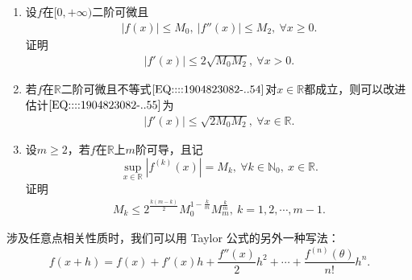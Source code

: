 \documentclass[../../main.tex]{subfiles}%
\begin{document}
\begin{proposition}[导数内插]\label{proposition:导数内插}
\begin{enumerate}
\item 设\( f \)在\( [0,+\infty) \)二阶可微且
\begin{align}
|f(x)| \leqslant M_0, \ |f''(x)| \leqslant M_2, \ \forall x \geqslant 0. \label{EQ::::1904823082-..54}
\end{align}
证明
\begin{align}
|f'(x)| \leqslant 2\sqrt{M_0 M_2}, \ \forall x > 0. \label{EQ::::1904823082-..55}
\end{align}

\item 若\( f \)在\( \mathbb{R} \)二阶可微且不等式\(\eqref{EQ::::1904823082-..54}\)对\( x \in \mathbb{R} \)都成立，则可以改进估计\(\eqref{EQ::::1904823082-..55}\)为
\begin{align}
|f'(x)| \leqslant \sqrt{2 M_0 M_2}, \ \forall x \in \mathbb{R}. \label{EQ::::1904823082-..56}
\end{align}

\item 设\( m \geqslant 2 \)，若\( f \)在\( \mathbb{R} \)上\( m \)阶可导，且记
\[
\sup_{x \in \mathbb{R}} \left| f^{(k)}(x) \right| = M_k, \ \forall k \in \mathbb{N}_0, \ x \in \mathbb{R}.
\]
证明
\begin{align}
M_k \leqslant 2^{\frac{k(m - k)}{2}} M_0^{1 - \frac{k}{m}} M_m^{\frac{k}{m}}, \ k = 1,2,\cdots, m - 1. \label{EQ::::1904823082-..57}
\end{align}
\end{enumerate}
\end{proposition}
\begin{note}
涉及任意点相关性质时，我们可以用 Taylor 公式的另外一种写法：
\[
f(x + h) = f(x) + f'(x)h + \frac{f''(x)}{2} h^2 + \cdots + \frac{f^{(n)}(\theta)}{n!} h^n.
\]
\end{note}
\end{document}
